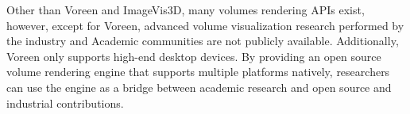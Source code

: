 Other than Voreen and ImageVis3D, many volumes rendering APIs exist, however, except for
Voreen, advanced volume visualization research performed by the industry and
Academic communities are not publicly available. Additionally, Voreen only supports
high-end desktop devices. By providing an open source volume rendering engine that
supports multiple platforms natively,  researchers can use the engine as a bridge
between academic research and open source and industrial contributions.
